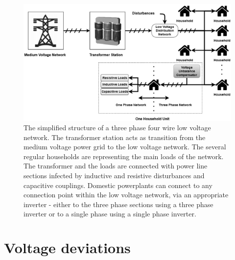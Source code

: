         \begin{figure}[!ht]
            \centering
            \includegraphics[width=\textwidth]{Unblance_EPS_Pics/network_gray.eps}
            \caption{The simplified structure of a three phase four wire low voltage network. The transformer station acts as transition from the medium voltage power grid to
            the low voltage network. The several regular households are representing the main loads of the network. The transformer and the loads are connected with power line sections infected by inductive and resistive disturbances and capacitive couplings. Domestic powerplants can connect to any connection point within the low voltage network, via an appropriate inverter - either to the three phase sections using a three phase inverter or to a single phase using a single phase inverter.}
            \label{fig:network}
            \end{figure}


    \section{Voltage deviations}



